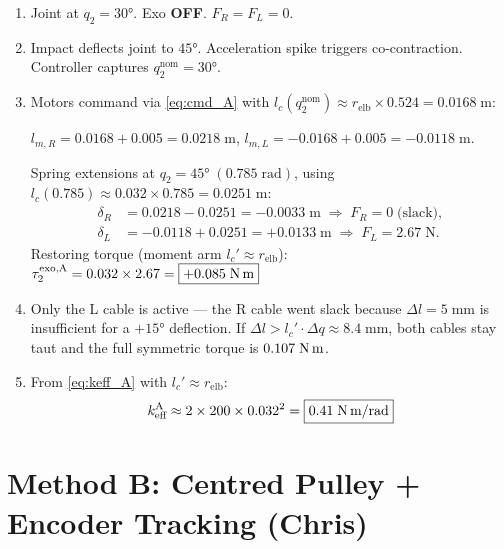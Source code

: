 \documentclass[11pt, a4paper]{article}
\begin{document}
\begin{enumerate}
    \item[\textbf{T$_0$}:] Joint at $q_2 = 30°$.  Exo \textbf{OFF}.
        $F_R = F_L = 0$.

    \item[\textbf{T$_1$}:] Impact deflects joint to $45°$.
        Acceleration spike triggers co-contraction.
        Controller captures $q_2^{\text{nom}} = 30°$.

    \item[\textbf{T$_2$}:] Motors command via \eqref{eq:cmd_A} with
        $l_c(q_2^{\text{nom}}) \approx r_{\text{elb}} \times 0.524 = 0.0168\;\text{m}$:

        $l_{m,R} = 0.0168 + 0.005 = 0.0218\;\text{m}$,\;
        $l_{m,L} = -0.0168 + 0.005 = -0.0118\;\text{m}$.

        Spring extensions at $q_2 = 45°\;(0.785\;\text{rad})$,
        using $l_c(0.785) \approx 0.032 \times 0.785 = 0.0251\;\text{m}$:
        \begin{align*}
            \delta_R &= 0.0218 - 0.0251 = -0.0033\;\text{m}
                \;\Rightarrow\; F_R = 0 \;\text{(slack)}, \\
            \delta_L &= -0.0118 + 0.0251 = +0.0133\;\text{m}
                \;\Rightarrow\; F_L = 2.67\;\text{N}.
        \end{align*}
        Restoring torque (moment arm $l_c' \approx r_{\text{elb}}$):
        $\tau_2^{\text{exo,A}} = 0.032 \times 2.67 = \boxed{+0.085\;\text{N\,m}}$

    \item[\textbf{Note}:] Only the L cable is active --- the R cable went
        slack because $\Delta l = 5\;\text{mm}$ is insufficient for a
        $+15°$ deflection.  If $\Delta l > l_c' \cdot \Delta q
        \approx 8.4\;\text{mm}$, both cables stay taut and the full symmetric
        torque is $0.107\;\text{N\,m}$.

    \item[\textbf{Approximate $k_{\text{eff}}^{\text{A}}$}:]
        From \eqref{eq:keff_A} with $l_c' \approx r_{\text{elb}}$:
        \[
            k_{\text{eff}}^{\text{A}} \approx 2 \times 200 \times 0.032^2
            = \boxed{0.41\;\text{N\,m/rad}}
        \]
\end{enumerate}


\section{Method B: Centred Pulley + Encoder Tracking (Chris)}
\label{sec:methodB}
\end{document}
